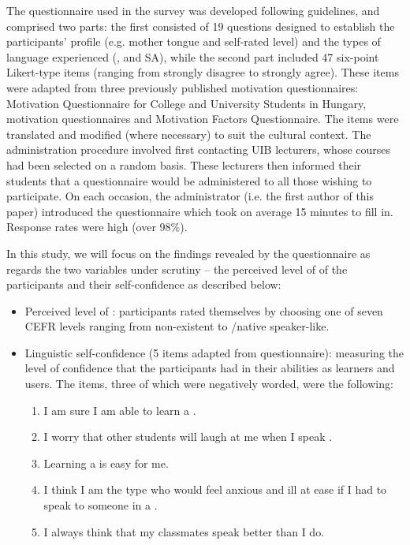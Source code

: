 \documentclass[output=paper]{langsci/langscibook}
\begin{document}
  
The questionnaire used in the survey was developed following  guidelines, and comprised two parts: the first consisted of 19 questions designed to establish the participants’  profile (e.g. mother tongue and self-rated   level) and the types of language  experienced (,  and SA), while the second part included 47 six-point Likert-type items (ranging from strongly disagree to strongly agree). These items were adapted from three previously published motivation questionnaires: \cite{CsizérKormos2009} Motivation Questionnaire for College and University Students in Hungary,  motivation questionnaires and  Motivation Factors Questionnaire. The items were translated and modified (where necessary) to suit the  cultural context. The administration procedure involved first contacting UIB lecturers, whose  courses had been selected on a random basis. These lecturers then informed their students that a questionnaire would be administered to all those wishing to participate. On each occasion, the administrator (i.e. the first author of this paper) introduced the questionnaire which took on average 15 minutes to fill in. Response rates were high (over 98\%).



In this study, we will focus on the findings revealed by the questionnaire as regards the two variables under scrutiny – the perceived level of  of the participants and their  self-confidence as described below:


\begin{itemize}
\item Perceived level of :  participants rated themselves by choosing one of seven CEFR levels ranging from non-existent to /native speaker-like. 
\item Linguistic self-confidence (5 items adapted from  questionnaire): measuring the level of confidence that the participants had in their abilities as  learners and users. The items, three of which were negatively worded, were the following:

\begin{enumerate}
\item I am sure I am able to learn a .
\item I worry that other students will laugh at me when I speak . 
\item Learning a  is easy for me. 
\item I think I am the type who would feel anxious and ill at ease if I had to speak to someone in a . 
\item I always think that my classmates speak  better than I do. 
\end{enumerate}
\end{itemize}
\end{document}
